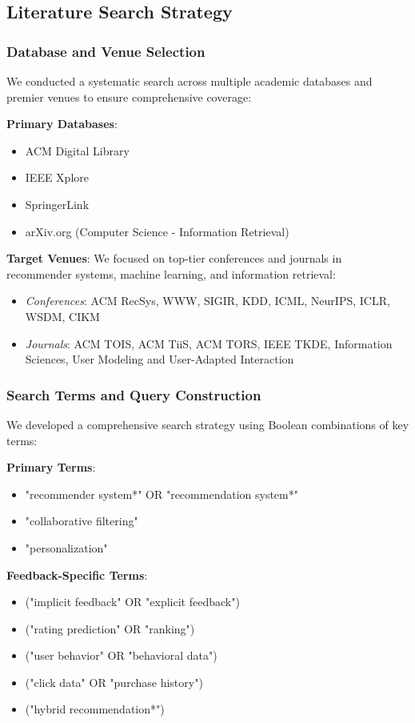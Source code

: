 \subsection{Literature Search Strategy}

\subsubsection{Database and Venue Selection}
We conducted a systematic search across multiple academic databases and premier venues to ensure comprehensive coverage:

\textbf{Primary Databases}:
\begin{itemize}
    \item ACM Digital Library
    \item IEEE Xplore
    \item SpringerLink
    \item arXiv.org (Computer Science - Information Retrieval)
\end{itemize}

\textbf{Target Venues}: We focused on top-tier conferences and journals in recommender systems, machine learning, and information retrieval:
\begin{itemize}
    \item \textit{Conferences}: ACM RecSys, WWW, SIGIR, KDD, ICML, NeurIPS, ICLR, WSDM, CIKM
    \item \textit{Journals}: ACM TOIS, ACM TiiS, ACM TORS, IEEE TKDE, Information Sciences, User Modeling and User-Adapted Interaction
\end{itemize}

\subsubsection{Search Terms and Query Construction}
We developed a comprehensive search strategy using Boolean combinations of key terms:

\textbf{Primary Terms}:
\begin{itemize}
    \item "recommender system*" OR "recommendation system*" 
    \item "collaborative filtering"
    \item "personalization"
\end{itemize}

\textbf{Feedback-Specific Terms}:
\begin{itemize}
    \item ("implicit feedback" OR "explicit feedback")
    \item ("rating prediction" OR "ranking")
    \item ("user behavior" OR "behavioral data")
    \item ("click data" OR "purchase history")
    \item ("hybrid recommendation*")
\end{itemize}


